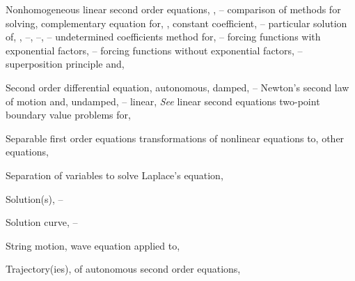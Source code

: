 \begin{tindex}
\item Nonhomogeneous linear second order equations, \pageref{eq:5.1.1},
\pageref{eq:5.3.1}--\pageref{exer:5.7.39}
\subitem comparison of methods for solving,   \pageref{exer:5.7.1}
\subitem complementary equation for, \pageref{eq:5.3.2},
\pageref{thmtype:5.3.2}
\subitem constant coefficient, \pageref{eq:5.4.1}--\pageref{exer:5.6.40}
\subitem particular solution of, \pageref{eq:5.3.2},
\pageref{thmtype:5.3.2}--\pageref{eq:5.3.17},
\pageref{eq:5.4.1}--\pageref{eq:5.4.17},
\pageref{eq:5.7.1}--\pageref{exer:5.7.1}
\subitem undetermined coefficients method for,
\pageref{eq:5.4.1}--\pageref{exer:5.6.40}
\subsubitem forcing functions with exponential factors,
\pageref{eq:5.5.15}--\pageref{exer:5.5.1}
\subsubitem forcing functions without exponential factors,
\pageref{eq:5.5.1}--\pageref{thmtype:5.5.2}
\subsubitem superposition principle and,  \pageref{eq:5.4.17}




\item Second order differential equation, \pageref{eq:1.1.10}
\subitem autonomous,
\subsubitem damped, \pageref{eq:4.4.27}--\pageref{exer:4.4.24}
\subsubitem Newton's second law of motion and, \pageref{eq:4.4.6}
\subsubitem undamped, \pageref{eq:4.4.7}--\pageref{eq:4.4.17}
\subitem linear, \emph{See} linear second equations
\subitem two-point boundary value problems for,

\item Separable first order equations
\subitem transformations of nonlinear equations to,
\subsubitem other equations,  \pageref{eq:2.4.4}

\item Separation of variables
\subitem to solve Laplace's equation,

\item Solution(s),  \pageref{example:1.2.1}--\pageref{eq:1.2.10}

\item Solution curve, \pageref{example:1.2.1}--\pageref{example:1.2.3}

\item String motion, wave equation applied to,


\item Trajectory(ies),
\subitem of autonomous second order equations, \pageref{eq:4.4.4}


\end{tindex}
